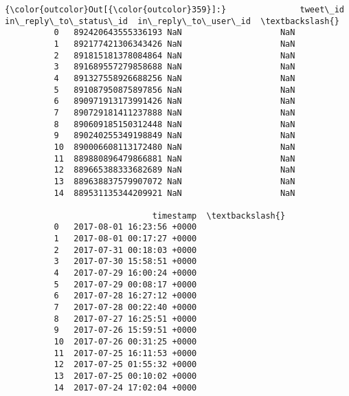 \documentclass[11pt]{article}
\begin{document}
\begin{Verbatim}[commandchars=\\\{\}]
{\color{outcolor}Out[{\color{outcolor}359}]:}               tweet\_id  in\_reply\_to\_status\_id  in\_reply\_to\_user\_id  \textbackslash{}
          0   892420643555336193 NaN                    NaN                    
          1   892177421306343426 NaN                    NaN                    
          2   891815181378084864 NaN                    NaN                    
          3   891689557279858688 NaN                    NaN                    
          4   891327558926688256 NaN                    NaN                    
          5   891087950875897856 NaN                    NaN                    
          6   890971913173991426 NaN                    NaN                    
          7   890729181411237888 NaN                    NaN                    
          8   890609185150312448 NaN                    NaN                    
          9   890240255349198849 NaN                    NaN                    
          10  890006608113172480 NaN                    NaN                    
          11  889880896479866881 NaN                    NaN                    
          12  889665388333682689 NaN                    NaN                    
          13  889638837579907072 NaN                    NaN                    
          14  889531135344209921 NaN                    NaN                    
          
                              timestamp  \textbackslash{}
          0   2017-08-01 16:23:56 +0000   
          1   2017-08-01 00:17:27 +0000   
          2   2017-07-31 00:18:03 +0000   
          3   2017-07-30 15:58:51 +0000   
          4   2017-07-29 16:00:24 +0000   
          5   2017-07-29 00:08:17 +0000   
          6   2017-07-28 16:27:12 +0000   
          7   2017-07-28 00:22:40 +0000   
          8   2017-07-27 16:25:51 +0000   
          9   2017-07-26 15:59:51 +0000   
          10  2017-07-26 00:31:25 +0000   
          11  2017-07-25 16:11:53 +0000   
          12  2017-07-25 01:55:32 +0000   
          13  2017-07-25 00:10:02 +0000   
          14  2017-07-24 17:02:04 +0000   
          

\end{Verbatim}
\end{document}
